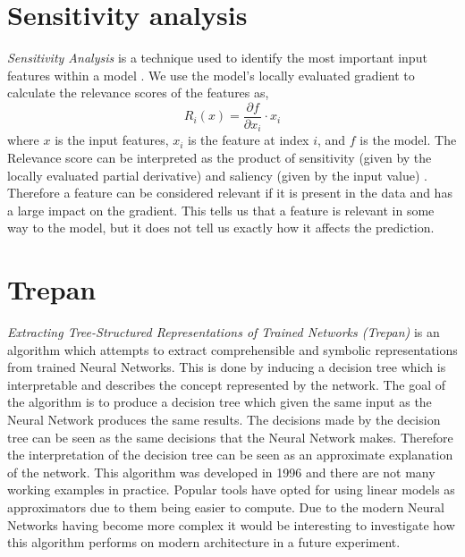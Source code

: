 \section{Sensitivity analysis}
\emph{Sensitivity Analysis} \cite{DBLP:journals/corr/MontavonSM17} is a technique used to identify the most important input features within a model \cite{Zhou2008}. We use the model's locally evaluated gradient to calculate the relevance scores of the features as,
\begin{equation}
    R_{i}(x) = \frac{\partial f}{\partial x_{i}} \cdot x_{i}
\end{equation}
where  $x$ is the input features, $x_{i}$ is the feature at index $i$, and $f$ is the model. The Relevance score can be interpreted as the product of sensitivity (given by the locally evaluated partial derivative) and saliency (given by the input value) \cite{DBLP:journals/corr/MontavonSM17}. Therefore a feature can be considered relevant if it is present in the data and has a large impact on the gradient. This tells us that a feature is relevant in some way to the model, but it does not tell us exactly how it affects the prediction.

\section{Trepan}
\emph{Extracting Tree-Structured Representations of Trained Networks (Trepan)} \cite{Craven1995ExtractingTR} is an algorithm which attempts to extract comprehensible and symbolic representations from trained Neural Networks. This is done by inducing a decision tree \cite{articleb} which is interpretable and describes the concept represented by the network. The goal of the algorithm is to produce a decision tree which given the same input as the Neural Network produces the same results. The decisions made by the decision tree can be seen as the same decisions that the Neural Network makes. Therefore the interpretation of the decision tree can be seen as an approximate explanation of the network.  This algorithm was developed in 1996 and there are not many working examples in practice. Popular tools have opted for using linear models as approximators due to them being easier to compute. Due to the modern Neural Networks having become more complex it would be interesting to investigate how this algorithm performs on modern architecture in a future experiment.

